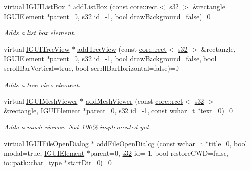\begin{DoxyCompactItemize}
virtual \hyperlink{classirr_1_1gui_1_1IGUIListBox}{I\+G\+U\+I\+List\+Box} $\ast$ \hyperlink{classirr_1_1gui_1_1IGUIEnvironment_af5990b3ad8c9bdc65e645a4cb508ad5f}{add\+List\+Box} (const \hyperlink{classirr_1_1core_1_1rect}{core\+::rect}$<$ \hyperlink{namespaceirr_ac66849b7a6ed16e30ebede579f9b47c6}{s32} $>$ \&rectangle, \hyperlink{classirr_1_1gui_1_1IGUIElement}{I\+G\+U\+I\+Element} $\ast$parent=0, \hyperlink{namespaceirr_ac66849b7a6ed16e30ebede579f9b47c6}{s32} id=-\/1, bool draw\+Background=false)=0
\begin{DoxyCompactList}\small\item\em Adds a list box element. \end{DoxyCompactList}\item 
virtual \hyperlink{classirr_1_1gui_1_1IGUITreeView}{I\+G\+U\+I\+Tree\+View} $\ast$ \hyperlink{classirr_1_1gui_1_1IGUIEnvironment_a3c82300cf7eaabc451ef20a04b432c32}{add\+Tree\+View} (const \hyperlink{classirr_1_1core_1_1rect}{core\+::rect}$<$ \hyperlink{namespaceirr_ac66849b7a6ed16e30ebede579f9b47c6}{s32} $>$ \&rectangle, \hyperlink{classirr_1_1gui_1_1IGUIElement}{I\+G\+U\+I\+Element} $\ast$parent=0, \hyperlink{namespaceirr_ac66849b7a6ed16e30ebede579f9b47c6}{s32} id=-\/1, bool draw\+Background=false, bool scroll\+Bar\+Vertical=true, bool scroll\+Bar\+Horizontal=false)=0
\begin{DoxyCompactList}\small\item\em Adds a tree view element. \end{DoxyCompactList}\item 
virtual \hyperlink{classirr_1_1gui_1_1IGUIMeshViewer}{I\+G\+U\+I\+Mesh\+Viewer} $\ast$ \hyperlink{classirr_1_1gui_1_1IGUIEnvironment_a4e35088a4346e5a80d1362e406a628e2}{add\+Mesh\+Viewer} (const \hyperlink{classirr_1_1core_1_1rect}{core\+::rect}$<$ \hyperlink{namespaceirr_ac66849b7a6ed16e30ebede579f9b47c6}{s32} $>$ \&rectangle, \hyperlink{classirr_1_1gui_1_1IGUIElement}{I\+G\+U\+I\+Element} $\ast$parent=0, \hyperlink{namespaceirr_ac66849b7a6ed16e30ebede579f9b47c6}{s32} id=-\/1, const wchar\+\_\+t $\ast$text=0)=0
\begin{DoxyCompactList}\small\item\em Adds a mesh viewer. Not 100\% implemented yet. \end{DoxyCompactList}\item 
virtual \hyperlink{classirr_1_1gui_1_1IGUIFileOpenDialog}{I\+G\+U\+I\+File\+Open\+Dialog} $\ast$ \hyperlink{classirr_1_1gui_1_1IGUIEnvironment_aaac7c786a19c5cac51a550ce77cd972a}{add\+File\+Open\+Dialog} (const wchar\+\_\+t $\ast$title=0, bool modal=true, \hyperlink{classirr_1_1gui_1_1IGUIElement}{I\+G\+U\+I\+Element} $\ast$parent=0, \hyperlink{namespaceirr_ac66849b7a6ed16e30ebede579f9b47c6}{s32} id=-\/1, bool restore\+C\+WD=false, io\+::path\+::char\+\_\+type $\ast$start\+Dir=0)=0

\end{DoxyCompactItemize}
